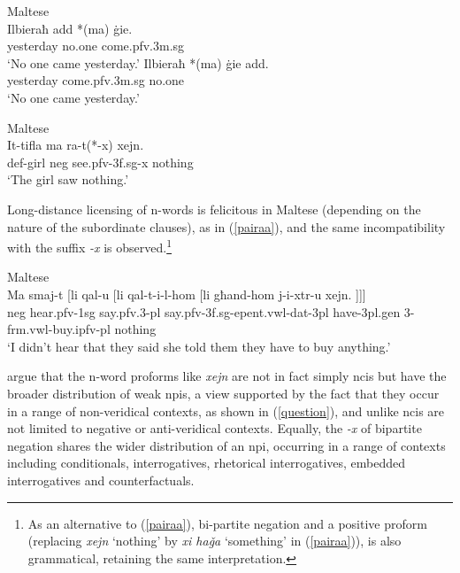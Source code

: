 \documentclass[output=paper,hidelinks]{langscibook}
\begin{document}
\ea \label{strictmt} Maltese \citep[150]{camilleri-sadler:2017} \\
\ea
\gll Ilbieraħ {\hwithstroke}add *(ma) {\.g}ie.\\
yesterday no.one \phantom{*(}{\sc neg} come.{\sc pfv.3m.sg}\\
\glt `No one came yesterday.'
\ex
\gll Ilbieraħ *(ma) {\.g}ie {\hwithstroke}add.\\
yesterday \phantom{*(}{\sc neg} come.{\sc pfv.3m.sg} no.one\\
\glt `No one came yesterday.'
 \z
\z





\ea\label{noxa} Maltese \citep[151]{camilleri-sadler:2017} \\
\gll It-tifla ma ra-t(*-x) xejn.\\
{\sc def-}girl {\sc neg} see.{\sc pfv-3f.sg-{\sc x}} nothing\\
\glt `The girl saw nothing.'
\z


Long-distance licensing of n-words is felicitous in Maltese (depending on the nature of the subordinate clauses), as in (\ref{pairaa}), and  the same incompatibility with the suffix {\em -x} is observed.\footnote{As an alternative to (\ref{pairaa}),  bi-partite negation and a positive  proform  (replacing  {\em xejn} `nothing' by {\em xi ha\v{g}a} `something' in (\ref{pairaa})),  is also grammatical,  retaining the same interpretation.}


\newpage



\ea\label{pairaa}  Maltese \citep[153]{camilleri-sadler:2017} \\
\gll Ma smaj-t [li qal-u [li qal-t-i-l-hom [li għand-hom j-i-xtr-u xejn. ]]]\\
{\sc neg} hear.{\sc pfv-1sg} \phantom{[}{\sc comp} say.{\sc pfv.3-pl} \phantom{[}{\sc comp} say.{\sc pfv-3f.sg-epent.vwl-dat-3pl} \phantom{[}{\sc comp} have-{\sc 3pl.gen} 3-{\sc frm.vwl}-buy.{\sc ipfv-pl} nothing\\
\glt `I didn't hear that they said  she told them they have to buy anything.'
\z





\citet{camilleri-sadler:2017} argue that the n-word proforms like {\em xejn} are not in fact simply {\sc nci}s but have the broader distribution of  weak {\sc npi}s, a view supported by the fact that they occur in a range of non-veridical contexts, as shown in (\ref{question}), and unlike {\sc nci}s are not limited to negative or anti-veridical contexts.
Equally, the {\em -x} of bipartite negation shares the wider distribution of an {\sc npi}, occurring in a range of contexts including conditionals, interrogatives,  rhetorical interrogatives,  embedded interrogatives and counterfactuals.
\end{document}
